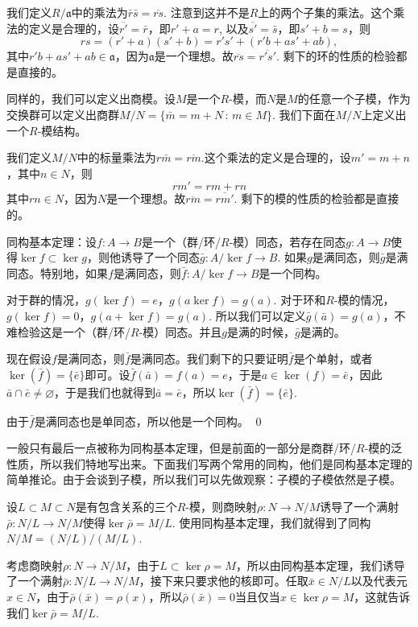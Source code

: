 我们定义$R/\mathfrak{a}$中的乘法为$\bar{r}\bar{s}=\overline{rs}$. 注意到这并不是$R$上的两个子集的乘法。这个乘法的定义是合理的，设$\overline{r'}=\bar{r}$，即$r'+a=r$, 以及$\overline{s'}=\bar{s}$，即$s'+b =s$，则
\[
	rs=(r'+a)(s'+b)=r's'+(r'b+as'+ab),
\]
其中$r'b+as'+ab\in \mathfrak{a}$，因为$\mathfrak{a}$是一个理想。故$\overline{rs}=\overline{r's'}$. 剩下的环的性质的检验都是直接的。

\para 同样的，我们可以定义出商模。设$M$是一个$R$-模，而$N$是$M$的任意一个子模，作为交换群可以定义出商群$M/N=\{\bar{m}=m+N\,:\, m\in M\}$. 我们下面在$M/N$上定义出一个$R$-模结构。

我们定义$M/N$中的标量乘法为$r\bar{m}=\overline{rm}$.这个乘法的定义是合理的，设$m'=m+n$，其中$n\in N$，则
\[
	rm'=rm+rn
\]
其中$rn\in N$，因为$N$是一个理想。故$\overline{rm}=\overline{rm'}$. 剩下的模的性质的检验都是直接的。

\theo 同构基本定理：设$f:A\to B$是一个（群/环/$R$-模）同态，若存在同态$g: A\to B$使得$\ker f\subset \ker g$，则他诱导了一个同态$\bar{g}:A/\ker{f}\to B$. 如果$g$是满同态，则$\bar{g}$是满同态。特别地，如果$f$是满同态，则$\bar{f}: A/\ker{f}\to B$是一个同构。

\proof
	对于群的情况，$g(\ker f)=e$，$g(a\ker f)=g(a)$. 对于环和$R$-模的情况，$g(\ker f)=0$，$g(a+\ker f)=g(a)$. 所以我们可以定义$\bar{g}(\bar{a})=g(a)$，不难检验这是一个（群/环/$R$-模）同态。并且$g$是满的时候，$\bar{g}$是满的。

	现在假设$f$是满同态，则$\bar{f}$是满同态。我们剩下的只要证明$\bar{f}$是个单射，或者$\ker(\bar{f})=\{\bar{e}\}$即可。设$\bar{f}(\bar{a})=f(a)=e$，于是$a\in \ker(f)=\bar{e}$，因此$\bar{a}\cap \bar{e}\neq\varnothing$，于是我们也就得到$\bar{a}=\bar{e}$，所以$\ker(\bar{f})=\{\bar{e}\}$. 

	由于$\bar{f}$是满同态也是单同态，所以他是一个同构。
\qed

一般只有最后一点被称为同构基本定理，但是前面的一部分是商群/环/$R$-模的泛性质，所以我们特地写出来。下面我们写两个常用的同构，他们是同构基本定理的简单推论。由于会谈到子模，所以我们可以先做观察：子模的子模依然是子模。

\para 设$L\subset M \subset N$是有包含关系的三个$R$-模，则商映射$\rho:N\to N/M$诱导了一个满射$\bar{\rho}:N/L \to N/M$使得$\ker \bar{\rho}=M/L$. 使用同构基本定理，我们就得到了同构$N/M=(N/L)/(M/L)$.

考虑商映射$\rho:N\to N/M$，由于$L\subset \ker \rho=M$，所以由同构基本定理，我们诱导了一个满射$\bar{\rho}:N/L \to N/M$，接下来只要求他的核即可。任取$\bar{x}\in N/L$以及代表元$x\in N$，由于$\bar{\rho}(\bar{x})=\rho(x)$，所以$\bar{\rho} (\bar{x})=0$当且仅当$x\in \ker \rho =M$，这就告诉我们$\ker \bar{\rho}=M/L$.

